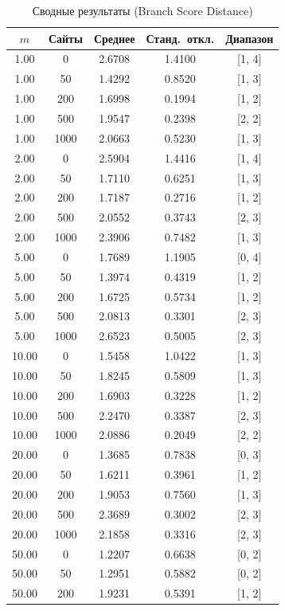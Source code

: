 \documentclass{article}
\begin{document}
\begin{table}[h]
\centering
\caption{Сводные результаты (Branch Score Distance)}
\label{tab:bsd}
\begin{tabular}{ccccc}
\hline
$m$ & Сайты & Среднее & Станд.~откл. & Диапазон \\
\hline
1.00  & 0    & 2.6708 & 1.4100 & [1, 4] \\
1.00  & 50   & 1.4292 & 0.8520 & [1, 3] \\
1.00  & 200  & 1.6998 & 0.1994 & [1, 2] \\
1.00  & 500  & 1.9547 & 0.2398 & [2, 2] \\
1.00  & 1000 & 2.0663 & 0.5230 & [1, 3] \\
2.00  & 0    & 2.5904 & 1.4416 & [1, 4] \\
2.00  & 50   & 1.7110 & 0.6251 & [1, 3] \\
2.00  & 200  & 1.7187 & 0.2716 & [1, 2] \\
2.00  & 500  & 2.0552 & 0.3743 & [2, 3] \\
2.00  & 1000 & 2.3906 & 0.7482 & [1, 3] \\
5.00  & 0    & 1.7689 & 1.1905 & [0, 4] \\
5.00  & 50   & 1.3974 & 0.4319 & [1, 2] \\
5.00  & 200  & 1.6725 & 0.5734 & [1, 2] \\
5.00  & 500  & 2.0813 & 0.3301 & [2, 3] \\
5.00  & 1000 & 2.6523 & 0.5005 & [2, 3] \\
10.00 & 0    & 1.5458 & 1.0422 & [1, 3] \\
10.00 & 50   & 1.8245 & 0.5809 & [1, 3] \\
10.00 & 200  & 1.6903 & 0.3228 & [1, 2] \\
10.00 & 500  & 2.2470 & 0.3387 & [2, 3] \\
10.00 & 1000 & 2.0886 & 0.2049 & [2, 2] \\
20.00 & 0    & 1.3685 & 0.7838 & [0, 3] \\
20.00 & 50   & 1.6211 & 0.3961 & [1, 2] \\
20.00 & 200  & 1.9053 & 0.7560 & [1, 3] \\
20.00 & 500  & 2.3689 & 0.3002 & [2, 3] \\
20.00 & 1000 & 2.1858 & 0.3316 & [2, 3] \\
50.00 & 0    & 1.2207 & 0.6638 & [0, 2] \\
50.00 & 50   & 1.2951 & 0.5882 & [0, 2] \\
50.00 & 200  & 1.9231 & 0.5391 & [1, 2] \\

\end{tabular}
\end{table}
\end{document}
